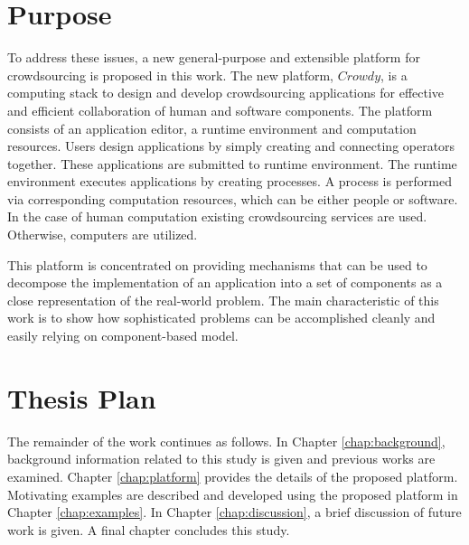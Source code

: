 \section{Purpose}

To address these issues, a new general-purpose and extensible platform for crowdsourcing 
is proposed in this work. The new platform, $Crowdy$, is a computing stack to design 
and develop crowdsourcing applications for effective and efficient collaboration of
human and software components. The platform consists of an application editor, a runtime 
environment and computation resources. Users design applications by simply 
creating and connecting operators together. These applications are submitted to runtime 
environment. The runtime environment executes applications by creating processes. 
A process is performed via corresponding computation resources, which can be either 
people or software. In the case of human computation existing crowdsourcing services 
are used. Otherwise, computers are utilized.

This platform is concentrated on providing mechanisms that can be used to decompose 
the implementation of an application into a set of components as a close representation 
of the real-world problem. The main characteristic of this work is to show how 
sophisticated problems can be accomplished cleanly and easily relying on 
component-based model.


\section{Thesis Plan}

The remainder of the work continues as follows. In Chapter \ref{chap:background}, 
background information related to this study is given and previous works are examined. 
Chapter \ref{chap:platform} provides the details of the proposed platform. Motivating 
examples are described and developed using the proposed platform in Chapter 
\ref{chap:examples}. In Chapter \ref{chap:discussion}, a brief discussion of future work 
is given. A final chapter concludes this study.
